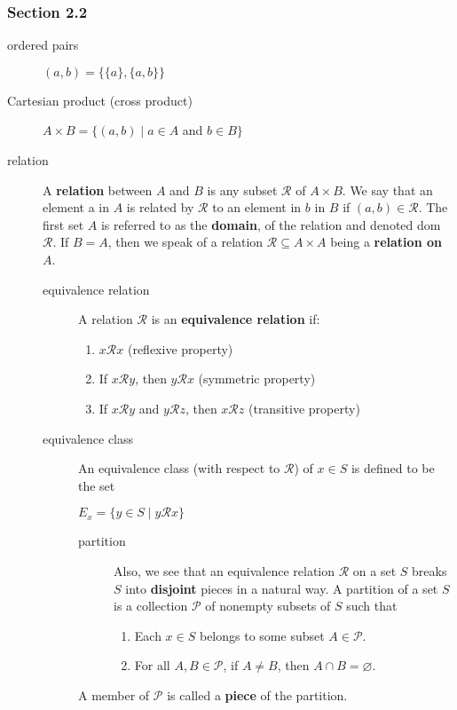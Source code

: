 \documentclass[12pt]{article}
\newcommand\sube{\subseteq}
\newcommand\R{\mathcal{R}}
\newcommand\pow{\mathscr{P}}
\newcommand\nil{\varnothing}
\begin{document}
\subsubsection{Section 2.2}
\label{sec:org0ed579d}
\begin{description}
\item[{ordered pairs}] \((a,b)=\{\{a\},\{a,b\}\}\)
\item[{Cartesian product (cross product)}] \(A\times{}B=\{(a,b)\mid{}a\in{}A\) and \(b\in{}B\}\)
\item[{relation}] A \textbf{relation} between \(A\) and \(B\) is any subset \(\R\) of \(A\times{}B\). We say
that an element a in \(A\) is related by \(\R\) to an element in \(b\) in
\(B\) if \((a,b)\in{}\R\). The first set \(A\) is referred to as the \textbf{domain},
of the relation and denoted dom \(\R\). If \(B=A\), then we speak of a
relation \(\R\sube{}A\times{}A\) being a \textbf{relation on} \(A\).
\begin{description}
\item[{equivalence relation}] A relation \(\R\) is an \textbf{equivalence relation} if:
\begin{enumerate}
\item \(x\R{}x\) \hfill (reflexive property)
\item If \(x\R{}y\), then \(y\R{}x\) \hfill (symmetric property)
\item If \(x\R{}y\) and \(y\R{}z\), then \(x\R{}z\) \hfill (transitive property)
\end{enumerate}
\item[{equivalence class}] An equivalence class (with respect to \(\R\)) of \(x\in{}S\) is
defined to be the set
\begin{center}
\(E_{x}=\{y\in{}S\mid{}y\R{}x\}\)
\end{center}
\begin{description}
\item[{partition}] Also, we see that an equivalence relation \(\R\) on a set \(S\)
breaks \(S\) into \textbf{disjoint} pieces in a natural way. A partition
of a set \(S\) is a collection \(\pow\) of nonempty subsets of
\(S\) such that
\begin{enumerate}
\item Each \(x\in{}S\) belongs to some subset \(A\in\pow\).
\item For all \(A,B\in\pow\), if \(A\ne{}B\), then \(A\cap{}B=\nil\).
\end{enumerate}
\end{description}
A member of \(\pow\) is called a \textbf{piece} of the partition.
\end{description}
\end{description}
\end{document}
